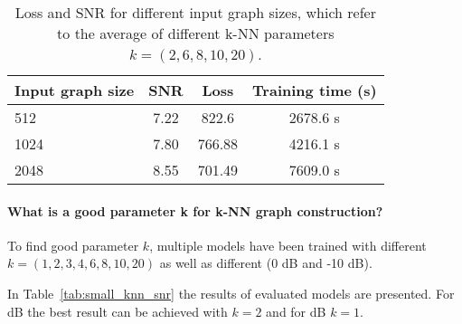   \begin{table}[H]
    \centering
      \begin{tabular}{l|ccc}
      \toprule
      \textbf{Input graph size} & \textbf{SNR} & \textbf{Loss} & \textbf{Training time (s)}  \\ 
      \midrule
      512  &  7.22    &  822.6  & 2678.6 s \\ \hline
      1024 &  7.80    &  766.88 & 4216.1 s \\ \hline
      2048 &  8.55    &  701.49 & 7609.0 s  \\ \hline
      \midrule
      \end{tabular}
    \caption{Loss and SNR for different input graph sizes, which refer to the average of 
    different k-NN parameters $k = (2,6,8,10,20)$.}
    \label{tab:graph_knn}
  \end{table}

  \paragraph{What is a good parameter k for k-NN graph construction?}

  To find good parameter $k$, multiple models have been trained with different $k=(1,2,3,4,6,8,10,20)$
  as well as different \snry (0 dB and -10 dB).

  In Table~\ref{tab:small_knn_snr} the results of evaluated models are presented.
  For  dB the best result can be achieved with $k=2$ and for  dB $k=1$.

  



